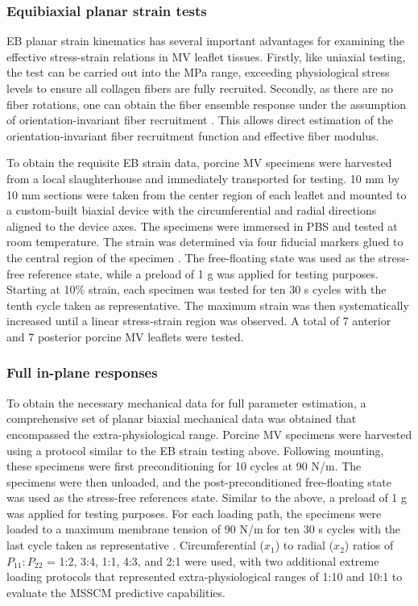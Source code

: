 \subsubsection{Equibiaxial planar strain tests}

    EB planar strain kinematics has several important advantages for examining the effective stress-strain relations in MV leaflet tissues. Firstly, like uniaxial testing, the test can be carried out into the MPa range, exceeding physiological stress levels to ensure all collagen fibers are fully recruited. Secondly, as there are no fiber rotations, one can obtain the fiber ensemble response under the assumption of orientation-invariant fiber recruitment \cite{fata_insights_2014,sacks_incorporation_2003,fan_simulation_2014}. This allows direct estimation of the orientation-invariant fiber recruitment function and effective fiber modulus.
    
    
    To obtain the requisite EB strain data, porcine MV specimens were harvested from a local slaughterhouse and immediately transported for testing. 10 mm by 10 mm sections were taken from the center region of each leaflet and mounted to a custom-built biaxial device \cite{grashow_biaxial_2006,grashow_planar_2006} with the circumferential and radial directions aligned to the device axes. The specimens were immersed in PBS and tested at room temperature. The strain was determined via four fiducial markers glued to the central region of the specimen \cite{billiar_biaxial_2000}. The free-floating state was used as the stress-free reference state, while a preload of 1 g was applied for testing purposes. Starting at 10\% strain, each specimen was tested for ten 30 s cycles with the tenth cycle taken as representative. The maximum strain was then systematically increased until a linear stress-strain region was observed. A total of 7 anterior and 7 posterior porcine MV leaflets were tested.


\subsubsection{Full in-plane responses}

    To obtain the necessary mechanical data for full parameter estimation, a comprehensive set of planar biaxial mechanical data was obtained that encompassed the extra-physiological range. Porcine MV specimens were harvested using a protocol similar to the EB strain testing above. Following mounting, these specimens were first preconditioning for 10 cycles at 90 N/m. The specimens were then unloaded, and the post-preconditioned free-floating state was used as the stress-free references state. Similar to the above, a preload of 1 g was applied for testing purposes. For each loading path, the specimens were loaded to a maximum membrane tension of 90 N/m for ten 30 s cycles with the last cycle taken as representative \cite{grashow_biaxial_2006,grashow_planar_2006}. Circumferential ($x_1$) to radial ($x_2$) ratios of $P_{11}:P_{22}$ = 1:2, 3:4, 1:1, 4:3, and 2:1 were used, with two additional extreme loading protocols that represented extra-physiological ranges of 1:10 and 10:1 to evaluate the MSSCM predictive capabilities.
    
